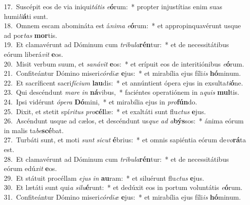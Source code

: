 {17.~}Suscépit eos de via iniqui\textit{tá}\textit{tis} \textit{e}\textbf{ó}rum:~* propter injustítias enim suas humi\textit{li}\textbf{á}ti sunt.\\
{18.~}Omnem escam abomináta est á\textit{ni}\textit{ma} \textit{e}\textbf{ó}rum:~* et appropinquavérunt usque ad por\textit{tas} \textbf{mor}tis.\\
{19.~}Et clamavérunt ad Dóminum cum \textit{tri}\textit{bu}\textit{la}\textbf{rén}tur:~* et de necessitátibus eórum liberá\textit{vit} \textbf{e}os.\\
{20.~}Misit verbum suum, et \textit{sa}\textit{ná}\textit{vit} \textbf{e}os:~* et erípuit eos de interitiónibus \textit{e}\textbf{ó}rum.\\
{21.~}Confiteántur Dómino miseri\textit{cór}\textit{di}\textit{æ} \textbf{e}jus:~* et mirabília ejus fíli\textit{is} \textbf{hó}minum.\\
{22.~}Et sacríficent sacri\textit{fí}\textit{ci}\textit{um} \textbf{lau}dis:~* et annúntient ópera ejus in exsulta\textit{ti}\textbf{ó}ne.\\
{23.~}Qui descéndunt \textit{ma}\textit{re} \textit{in} \textbf{ná}vibus,~* faciéntes operatiónem in a\textit{quis} \textbf{mul}tis.\\
{24.~}Ipsi vidérunt \textit{ó}\textit{pe}\textit{ra} \textbf{Dó}mini,~* et mirabília ejus in \textit{pro}\textbf{fún}do.\\
{25.~}Dixit, et stetit spí\textit{ri}\textit{tus} \textit{pro}\textbf{cél}læ:~* et exaltáti sunt flu\textit{ctus} \textbf{e}jus.\\
{26.~}Ascéndunt usque ad cælos, et descéndunt us\textit{que} \textit{ad} \textit{a}\textbf{býs}sos:~* ánima eórum in malis ta\textit{be}\textbf{scé}bat.\\
{27.~}Turbáti sunt, et moti \textit{sunt} \textit{si}\textit{cut} \textbf{é}brius:~* et omnis sapiéntia eórum de\textit{vo}\textbf{rá}ta est.\\
{28.~}Et clamavérunt ad Dóminum cum \textit{tri}\textit{bu}\textit{la}\textbf{rén}tur:~* et de necessitátibus eórum edú\textit{xit} \textbf{e}os.\\
{29.~}Et státuit procéllam \textit{e}\textit{jus} \textit{in} \textbf{au}ram:~* et siluérunt flu\textit{ctus} \textbf{e}jus.\\
{30.~}Et lætáti sunt qui\textit{a} \textit{si}\textit{lu}\textbf{é}runt:~* et dedúxit eos in portum voluntátis \textit{e}\textbf{ó}rum.\\
{31.~}Confiteántur Dómino miseri\textit{cór}\textit{di}\textit{æ} \textbf{e}jus:~* et mirabília ejus fíli\textit{is} \textbf{hó}minum.\\
